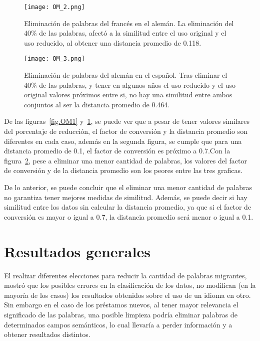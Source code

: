 \begin{figure}[h!]
	\centering
	\texttt{[image: OM\_2.png]}
	\caption{Eliminación de palabras del francés en el alemán. La eliminación del 40$\%$ de las palabras, afectó a la similitud entre el uso original y el uso reducido, al obtener una distancia promedio de 0.118.}
	\label{fig.OM2}
\end{figure}

\begin{figure}[h!]
	\centering
	\texttt{[image: OM\_3.png]}
	\caption{Eliminación de palabras del alemán en el español. Tras eliminar el 40$\%$ de las palabras, y  tener en algunos años el uso reducido y el uso original valores próximos entre si, no hay una similitud entre ambos conjuntos al ser la distancia promedio de  0.464.}
	\label{fig.OM3}
\end{figure}


De las figuras~\ref{fig.OM1} y~\ref{fig.OM2}, se puede ver que a pesar de tener valores similares del porcentaje de reducción, el factor de conversión y la distancia promedio son diferentes en cada caso, además en la segunda figura,  se cumple que para una distancia promedio de 0.1, el factor de conversión es próximo a 0.7.Con la figura~\ref{fig.OM3}, pese a eliminar una menor cantidad de palabras, los valores del factor de conversión y de la distancia promedio son los peores entre las tres graficas. 

De lo anterior, se puede concluir que el eliminar una menor cantidad de palabras no garantiza tener mejores medidas de similitud. Además, se puede decir si hay similitud entre los datos sin calcular la distancia promedio, ya que si el factor de conversión es mayor o igual a 0.7, la distancia promedio será menor o igual a 0.1. 

\section{Resultados generales}

El realizar diferentes elecciones para reducir la cantidad de palabras migrantes, mostró que los posibles errores en la clasificación de los datos, no modifican (en la mayoría de los casos) los resultados obtenidos sobre el uso de un idioma en otro. Sin embargo en el caso de los préstamos nuevos, al tener mayor relevancia el significado de las palabras, una posible limpieza podría eliminar palabras de determinados campos semánticos, lo cual llevaría a perder información y a obtener resultados distintos. 

